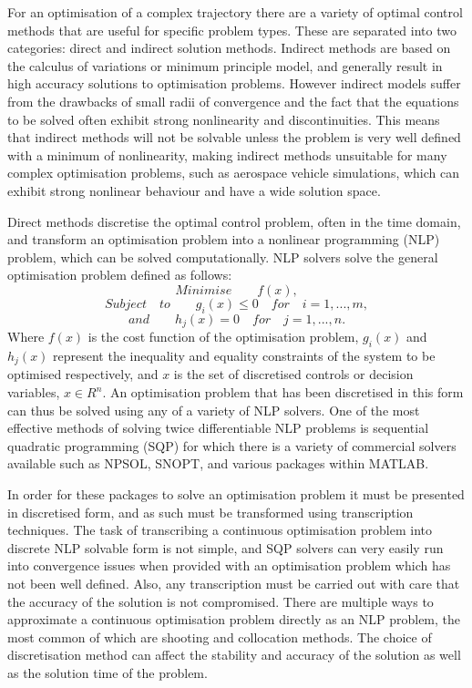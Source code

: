 For an optimisation of a complex trajectory there are a variety of optimal control methods that are useful for specific problem types. These are separated into two categories: direct and indirect solution methods\cite{Betts1998}. Indirect methods are based on the calculus of variations or minimum principle model, and generally result in high accuracy solutions to optimisation problems\cite{Bulirsch1993}. However indirect models suffer from the drawbacks of small radii of convergence and the fact that the equations to be solved often exhibit strong nonlinearity and discontinuities. This means that indirect methods will not be solvable unless the problem is very well defined with a minimum of nonlinearity, making indirect methods unsuitable for many complex optimisation problems, such as aerospace vehicle simulations, which can exhibit strong nonlinear behaviour and have a wide solution space. 

Direct methods discretise the optimal control problem, often in the time domain, and transform an optimisation problem into a nonlinear programming (NLP) problem, which can be solved computationally\cite{Stryk1992}. NLP solvers solve the general optimisation problem defined as follows\cite{Bazaraa2013}:
\begin{equation}
Minimise \qquad f(x),
\end{equation}
\begin{equation}
Subject \quad to \qquad g_i(x)\leq0 \quad for \quad i=1,...,m,
\end{equation}
\begin{equation}
and \qquad h_j(x) = 0 \quad for \quad j=1,...,n.
\end{equation}
Where $f(x)$ is the cost function of the optimisation problem, $g_i(x)$ and $h_j(x)$ represent the inequality and equality constraints of the system to be optimised respectively, and $x$ is the set of discretised controls or decision variables, $x \in R^n$. 
An optimisation problem that has been discretised in this form can thus be solved using any of a variety of NLP solvers. One of the most effective methods of solving twice differentiable NLP problems is sequential quadratic programming (SQP)\cite{Boggs2000} for which there is a variety of commercial solvers available such as NPSOL, SNOPT, and various packages within MATLAB. 

In order for these packages to solve an optimisation problem it must be presented in discretised form, and as such must be transformed using transcription techniques\cite{Kelly2015}. The task of transcribing a continuous optimisation problem into discrete NLP solvable form is not simple, and SQP solvers can very easily run into convergence issues when provided with an optimisation problem which has not been well defined. Also, any transcription must be carried out with care that the accuracy of the solution is not compromised. 
There are multiple ways to approximate a continuous optimisation problem directly as an NLP problem, the most common of which are shooting and collocation methods. The choice of discretisation method can affect the stability and accuracy of the solution as well as the solution time of the problem. 

